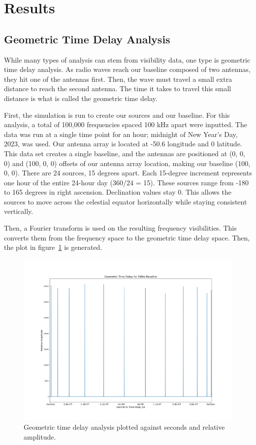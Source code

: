 \documentclass[12pt]{article}
\begin{document}
\section{Results}
\subsection{Geometric Time Delay Analysis}
While many types of analysis can stem from visibility data, one type is geometric time delay analysis. As radio waves reach our baseline composed of two antennas, they hit one of the antennas first. Then, the wave must travel a small extra distance to reach the second antenna. The time it takes to travel this small distance is what is called the geometric time delay. 

First, the simulation is run to create our sources and our baseline. For this analysis, a total of 100,000 frequencies spaced 100 kHz apart were inputted. The data was run at a single time point for an hour; midnight of New Year's Day, 2023, was used. Our antenna array is located at -50.6 longitude and 0 latitude. This data set creates a single baseline, and the antennas are positioned at (0, 0, 0) and (100, 0, 0) offsets of our antenna array location, making our baseline (100, 0, 0). There are 24 sources, 15 degrees apart. Each 15-degree increment represents one hour of the entire 24-hour day (360/24 = 15). These sources range from -180 to 165 degrees in right ascension. Declination values stay 0. This allows the sources to move across the celestial equator horizontally while staying consistent vertically. 

Then, a Fourier transform is used on the resulting frequency visibilities. This converts them from the frequency space to the geometric time delay space. Then, the plot in figure~\ref{fig:time_delay_plot} is generated.
\begin{figure}[H]
    \centering
    \includegraphics[width=0.75\linewidth]{time_delay_plot.png}
    \caption{Geometric time delay analysis plotted against seconds and relative amplitude.}
    \label{fig:time_delay_plot}
\end{figure}
\end{document}
